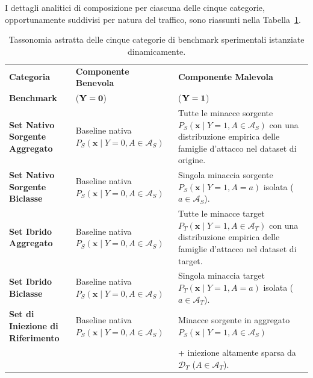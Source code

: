 I dettagli analitici di composizione per ciascuna delle cinque categorie, opportunamente suddivisi per natura del traffico, sono riassunti nella Tabella~\ref{tab:tassonomia_benchmark}.

\begin{table}[H]
    \centering
    \small
    \caption{Tassonomia astratta delle cinque categorie di benchmark sperimentali istanziate dinamicamente.}
    \label{tab:tassonomia_benchmark}
    \begin{tabularx}{\textwidth}{>{\raggedright\arraybackslash}p{3.5cm} >{\raggedright\arraybackslash}X >{\raggedright\arraybackslash}X }
        \toprule
        \textbf{Categoria} & \textbf{Componente Benevola} & \textbf{Componente Malevola} \\[-5pt]
        \textbf{Benchmark} & ($\bf{Y=0}$) & ($\bf{Y = 1}$) \\
        \midrule
        \textbf{Set Nativo Sorgente Aggregato} &
        Baseline nativa $P_S(\mathbf{x} \mid Y=0, A \in \mathcal{A}_S)$ &
        Tutte le minacce sorgente $P_S(\mathbf{x} \mid Y=1, A \in \mathcal{A}_S)$ con una distribuzione empirica delle famiglie d'attacco nel dataset di origine. \\
        \addlinespace
        \textbf{Set Nativo Sorgente Biclasse} &
        Baseline nativa $P_S(\mathbf{x} \mid Y=0, A \in \mathcal{A}_S)$ &
        Singola minaccia sorgente $P_S(\mathbf{x} \mid Y=1, A = a)$ isolata ($a \in \mathcal{A}_S$). \\
        \addlinespace
        \textbf{Set Ibrido Aggregato} &
        Baseline nativa $P_S(\mathbf{x} \mid Y=0, A \in \mathcal{A}_S)$ &
        Tutte le minacce target $P_T(\mathbf{x} \mid Y=1, A \in \mathcal{A}_T)$ con una distribuzione empirica delle famiglie d'attacco nel dataset di target. \\
        \addlinespace
        \textbf{Set Ibrido Biclasse} &
        Baseline nativa $P_S(\mathbf{x} \mid Y=0, A \in \mathcal{A}_S)$ &
        Singola minaccia target $P_T(\mathbf{x} \mid Y=1, A = a)$ isolata ($a \in \mathcal{A}_T$). \\
        \addlinespace
        \textbf{Set di Iniezione di Riferimento} &
        Baseline nativa $P_S(\mathbf{x} \mid Y=0, A \in \mathcal{A}_S)$ &
        Minacce sorgente in aggregato $P_S(\mathbf{x} \mid Y=1, A \in \mathcal{A}_S)$ \\
        & & + iniezione altamente sparsa da $\mathcal{D}_T$ ($A \in \mathcal{A}_T$). \\
        \bottomrule
    \end{tabularx}
\end{table}

